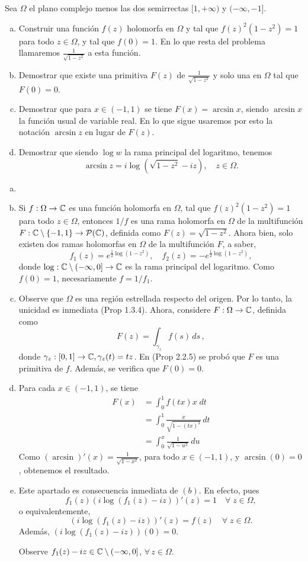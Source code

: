 \documentclass[twoside]{article}
\begin{document}
\begin{ejercicio}{10}
 Sea $\Omega$ el plano complejo menos las dos semirrectas $[1,+\infty)$ y $(-\infty,-1]$.
\begin{enumerate}[(a)]
\item Construir una función $f(z)$ holomorfa en $\Omega$ y tal que $f(z)^2(1-z^2)=1$ para todo $z\in\Omega$, y tal que $f(0)=1$. En lo que resta del problema llamaremos $\frac{1}{\sqrt{1-z^2}}$ a esta función.
\item Demostrar que existe una primitiva $F(z)$ de $\frac{1}{\sqrt{1-z^2}}$ y solo una en $\Omega$ tal que \mbox{$F(0)=0$.}
\item Demostrar que para $x\in(-1,1)$ se tiene $F(x)=\arcsin{x}$, siendo $\arcsin{x}$ la función usual de variable real. En lo que sigue usaremos por esto la notación $\arcsin{z}$ en lugar de $F(z)$. 
\item Demostrar que siendo $\log{w}$ la rama principal del logaritmo, tenemos 
\[\arcsin{z}=i\log(\sqrt{1-z^2}-iz),\quad z\in\Omega.\]
\end{enumerate}
\end{ejercicio}
\begin{solucion}

\begin{enumerate}[(a)]
\item[]
\item Si $f:\Omega \to \mathbb{C} $ es una función holomorfa en $\Omega $, tal que $f(z)^2(1-z^2)=1$ para todo $z\in\Omega $, entonces $1/f$ es una rama holomorfa en $\Omega $ de la multifunción {$F:\mathbb{C} \setminus \{-1,1\}\to \mathcal{P} (\mathbb{C} )$,} definida como $F(z)=\sqrt{1-z^2}$. Ahora bien, solo existen dos ramas holomorfas en $\Omega $ de la multifunción $F$, a saber, 
\[f_1(z)=e^{\frac{1}{2}\log(1-z^2)},\quad f_2(z)=-e^{\frac{1}{2}\log(1-z^2)},\]
donde $\log:\mathbb{C} \setminus {(-\infty,0]}\to\mathbb{C} $ es la rama principal del logaritmo. Como $f(0)=1$, necesariamente $f=1/f_1$. 
\item Observe que $\Omega $ es una región estrellada respecto del origen. Por lo tanto, la unicidad es inmediata (Prop 1.3.4). Ahora, considere $F:\Omega \to\mathbb{C} $, definida como 
\[F(z)=\int_{\gamma_z} f(s)\,ds\,,\]
donde $\gamma_z:[0,1]\to \mathbb{C} , \gamma_z(t)=tz$. En (Prop 2.2.5) se probó que $F$ es una primitiva de $f$. Además, se verifica que $F(0)=0$.
\item Para cada $x\in(-1,1)$, se tiene
\begin{align*}
F(x) & = \int_0^{1}f(tx)x\;dt\\
     & = \int_0^{1}\frac{x}{\sqrt{1-(tx)^2}}\,dt\\
     & = \int_0^x\frac{1}{\sqrt{1-u^2}}\,du
\end{align*}
Como $(\arcsin)'(x)=\frac{1}{\sqrt{1-x^2}}$, para todo $x\in(-1,1)$, y $\arcsin(0)=0$, obtenemos el resultado. 
\item Este apartado es consecuencia inmediata de $(b)$. En efecto, pues 
\[f_1(z)(i\log(f_1(z)-iz))'(z)=1\quad\forall\;z\in\Omega ,\]
o equivalentemente, 
\[(i\log(f_1(z)-iz))'(z)=f(z)\quad\forall\;z\in\Omega .\]
Además, $(i\log(f_1(z)-iz))(0)=0$.

Observe $f_1(z)-iz\in\mathbb{C} \setminus {(-\infty,0]}$, $\forall\,z\in\Omega $.
\end{enumerate}
\end{solucion}
\newpage
\end{document}

